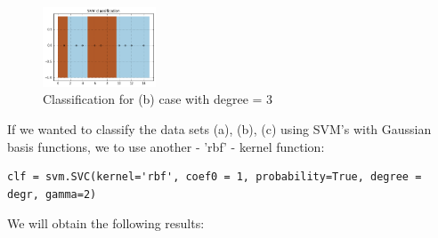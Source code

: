 \documentclass[a4paper, 12pt]{article}
\begin{document}
\begin{figure}[!htb]
  \centering
  \caption{Classification for (b) case with degree = 3 \label{fig:b3}}
  \includegraphics[width=0.3\textwidth]{b3}
\end{figure}


If we wanted to classify the data sets (a), (b), (c) using SVM’s with Gaussian basis functions, we to use another - 'rbf' - kernel function:

\lstset{language=Python}
\begin{lstlisting}[frame=single]
clf = svm.SVC(kernel='rbf', coef0 = 1, probability=True, degree = degr, gamma=2)
\end{lstlisting}

We will obtain the following results:
\end{document}
